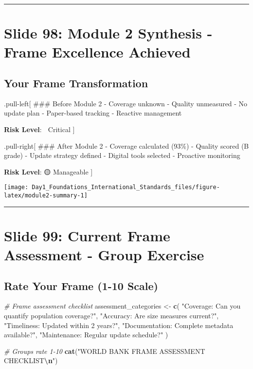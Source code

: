 \documentclass[
]{article}
\newenvironment{Shaded}{\begin{snugshade}}{\end{snugshade}}
\newcommand{\CommentTok}[1]{\textcolor[rgb]{0.56,0.35,0.01}{\textit{#1}}}
\newcommand{\FunctionTok}[1]{\textcolor[rgb]{0.13,0.29,0.53}{\textbf{#1}}}
\newcommand{\NormalTok}[1]{#1}
\newcommand{\OtherTok}[1]{\textcolor[rgb]{0.56,0.35,0.01}{#1}}
\newcommand{\SpecialCharTok}[1]{\textcolor[rgb]{0.81,0.36,0.00}{\textbf{#1}}}
\newcommand{\StringTok}[1]{\textcolor[rgb]{0.31,0.60,0.02}{#1}}
\begin{document}
\begin{center}\rule{0.5\linewidth}{0.5pt}\end{center}

\section{Slide 98: Module 2 Synthesis - Frame Excellence
Achieved}\label{slide-98-module-2-synthesis---frame-excellence-achieved}

\subsection{Your Frame Transformation}\label{your-frame-transformation}

.pull-left{[} \#\#\# Before Module 2 - Coverage unknown - Quality
unmeasured - No update plan - Paper-based tracking - Reactive management

\textbf{Risk Level}: 🔴 Critical {]}

.pull-right{[} \#\#\# After Module 2 - Coverage calculated (93\%) -
Quality scored (B grade) - Update strategy defined - Digital tools
selected - Proactive monitoring

\textbf{Risk Level}: 🟡 Manageable {]}

\texttt{[image: Day1\_Foundations\_International\_Standards\_files/figure-latex/module2-summary-1]}

\begin{center}\rule{0.5\linewidth}{0.5pt}\end{center}

\section{Slide 99: Current Frame Assessment - Group
Exercise}\label{slide-99-current-frame-assessment---group-exercise}

\subsection{Rate Your Frame (1-10
Scale)}\label{rate-your-frame-1-10-scale}

\begin{Shaded}
\begin{Highlighting}[]
\CommentTok{\# Frame assessment checklist}
\NormalTok{assessment\_categories }\OtherTok{\textless{}{-}} \FunctionTok{c}\NormalTok{(}
  \StringTok{"Coverage: Can you quantify population coverage?"}\NormalTok{,}
  \StringTok{"Accuracy: Are size measures current?"}\NormalTok{,}
  \StringTok{"Timeliness: Updated within 2 years?"}\NormalTok{,}
  \StringTok{"Documentation: Complete metadata available?"}\NormalTok{,}
  \StringTok{"Maintenance: Regular update schedule?"}
\NormalTok{)}

\CommentTok{\# Groups rate 1{-}10}
\FunctionTok{cat}\NormalTok{(}\StringTok{"WORLD BANK FRAME ASSESSMENT CHECKLIST}\SpecialCharTok{\textbackslash{}n}\StringTok{"}\NormalTok{)}
\end{Highlighting}
\end{Shaded}
\end{document}
